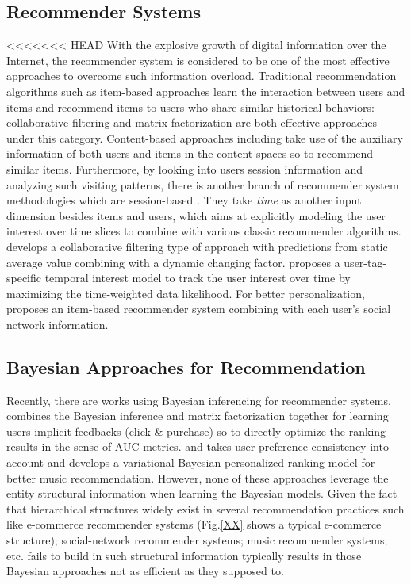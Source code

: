 \subsection{Recommender Systems}

<<<<<<< HEAD
With the explosive growth of digital information over the Internet, the recommender system is considered to be one of the most effective approaches to overcome such information overload. Traditional recommendation algorithms such as item-based approaches learn the interaction between users and items and recommend items to users who share similar historical behaviors: collaborative filtering \cite{Sarwar:2001:ICF:371920.372071,Su:2009:SCF:1592474.1722966} and matrix factorization \cite{Rendle:2010:FPM} are both effective approaches under this category.  Content-based approaches including \cite{2011rsh..book...73L,Liu:2011,Yuan:2015} take use of the auxiliary information of both users and items in the content spaces so to recommend similar items.  Furthermore, by looking into users session information and analyzing such visiting patterns, there is another branch of recommender system methodologies which are session-based \cite{Gultekin_acollaborative,Tang_review:2013}.  They take \emph{time} as another input dimension besides items and users, which aims at explicitly modeling the user interest over time slices to combine with various classic recommender algorithms. \cite{Koren:2010} develops a collaborative filtering type of approach with predictions from static average value combining with a dynamic changing factor.  \cite{Yin:2011} proposes a user-tag-specific temporal interest model to track the user interest over time by maximizing the time-weighted data likelihood.  For better personalization, \cite{Guy:2009} proposes an item-based recommender system combining with each user's social network information. 
\subsection{Bayesian Approaches for Recommendation}

Recently, there are works using Bayesian inferencing for recommender systems. \cite{rendle2009bpr} combines the Bayesian inference and matrix factorization together for learning users implicit feedbacks (click \& purchase) so to directly optimize the ranking results in the sense of AUC metrics. \cite{Ben-Elazar:2017} and \cite{zhang2007efficient} takes user preference consistency into account and develops a variational Bayesian personalized ranking model for better music recommendation.  However, none of these approaches leverage the entity structural information when learning the Bayesian models.  Given the fact that hierarchical structures widely exist in several recommendation practices such like e-commerce recommender systems (Fig.\ref{XX} shows a typical e-commerce structure); social-network recommender systems; music recommender systems; etc. fails to build in such structural information typically results in those Bayesian approaches not as efficient as they supposed to.  

